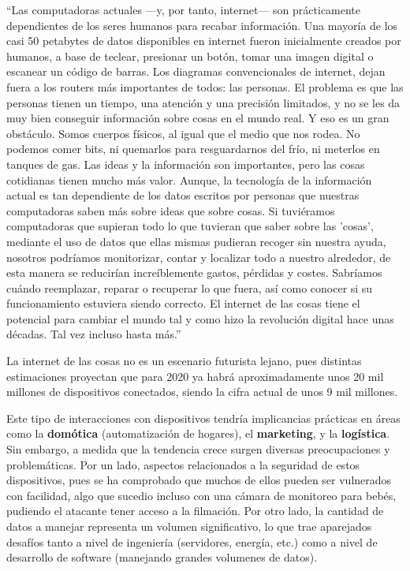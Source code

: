 ``Las computadoras actuales —y, por tanto, internet— son prácticamente
dependientes de los seres humanos para recabar información. Una mayoría de los
casi 50 petabytes de datos disponibles en internet fueron inicialmente creados
por humanos, a base de teclear, presionar un botón, tomar una imagen digital o
escanear un código de barras. Los diagramas convencionales de internet, dejan
fuera a los routers más importantes de todos: las personas. El problema es que
las personas tienen un tiempo, una atención y una precisión limitados, y no se
les da muy bien conseguir información sobre cosas en el mundo real. Y eso es un
gran obstáculo. Somos cuerpos físicos, al igual que el medio que nos rodea. No
podemos comer bits, ni quemarlos para resguardarnos del frío, ni meterlos en
tanques de gas. Las ideas y la información son importantes, pero las cosas
cotidianas tienen mucho más valor. Aunque, la tecnología de la información actual
es tan dependiente de los datos escritos por personas que nuestras computadoras
saben más sobre ideas que sobre cosas. Si tuviéramos computadoras que supieran
todo lo que tuvieran que saber sobre las 'cosas', mediante el uso de datos que
ellas mismas pudieran recoger sin nuestra ayuda, nosotros podríamos monitorizar,
contar y localizar todo a nuestro alrededor, de esta manera se reducirían
increíblemente gastos, pérdidas y costes. Sabríamos cuándo reemplazar, reparar o
recuperar lo que fuera, así como conocer si su funcionamiento estuviera siendo
correcto. El internet de las cosas tiene el potencial para cambiar el mundo tal
y como hizo la revolución digital hace unas décadas. Tal vez incluso hasta más.''
\textcite{ashton_2009}

La internet de las cosas no es un escenario futurista lejano, pues distintas
estimaciones proyectan que para 2020 ya habrá aproximadamente unos 20 mil
millones de dispositivos conectados, siendo la cifra actual de unos 9 mil millones.
\autocite{gartner_2017}

Este tipo de interacciones con dispositivos tendría implicancias prácticas
en áreas como la \textbf{domótica} (automatización de hogares), el \textbf{marketing},
y la \textbf{logística}. Sin embargo, a medida que la tendencia crece surgen
diversas preocupaciones y problemáticas. Por un lado, aspectos relacionados a
la seguridad de estos dispositivos, pues se ha comprobado que muchos de ellos
pueden ser vulnerados con facilidad, algo que sucedio incluso con una cámara de
monitoreo para bebés, pudiendo el atacante tener acceso a la filmación. Por otro
lado, la cantidad de datos a manejar representa un volumen significativo, lo que
trae aparejados desafíos tanto a nivel de ingeniería (servidores, energía, etc.)
como a nivel de desarrollo de software (manejando grandes volumenes de datos).


